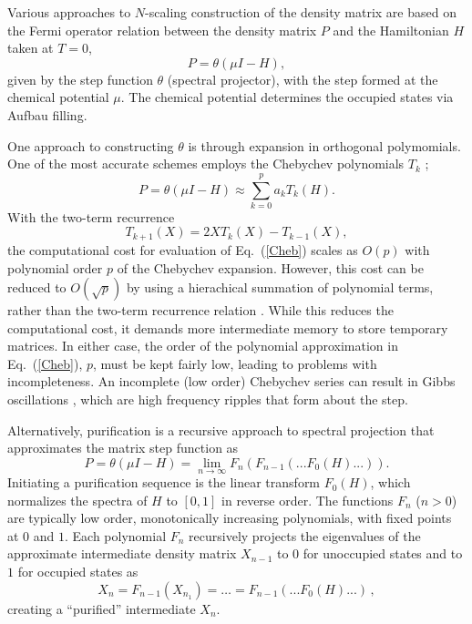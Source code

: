 \documentclass[twocolumn,showpacs,preprintnumbers,amsmath,amssymb]{revtex4}
\begin{document}
Various approaches to $N$-scaling construction of the density matrix are based on 
the Fermi operator relation between the density matrix $P$ and the Hamiltonian $H$
taken at $T=0$,
\begin{equation}\label{DM}
P = \theta(\mu I -  H),
\end{equation}
given by the step function $\theta$ (spectral projector), with the step formed at the chemical potential $\mu$.
The chemical potential determines the occupied states via Aufbau filling.   


One approach to constructing $\theta$ is through expansion in orthogonal polymomials.
One of the most accurate schemes employs the Chebychev polynomials $T_k$
\cite{SGoedecker94,RSilver94,LWang94,RBaer97,AVoter96,WLiang03};
\begin{equation}\label{Cheb}
P = \theta(\mu I -H) \approx \sum_{k=0}^p a_kT_k(H).
\end{equation}
With the two-term recurrence 
\begin{equation}
T_{k+1}(X) = 2XT_k(X)-T_{k-1}(X),
\end{equation}
the computational cost for evaluation of Eq.~(\ref{Cheb}) scales as $O(p)$ with
polynomial order $p$ of the Chebychev expansion. However, this cost can be reduced to 
$O({\sqrt p})$ by using a hierachical summation of polynomial terms, rather than the 
two-term recurrence relation \cite{MPaterson73,WLiang03}. While this reduces the 
computational cost, it demands more intermediate memory to store temporary matrices.  
In either case, the order of the polynomial approximation in Eq.~(\ref{Cheb}), $p$, must 
be kept fairly low, leading to problems with incompleteness.  An incomplete (low order) 
Chebychev series can result in Gibbs oscillations \cite{AVoter96}, which are high frequency 
ripples that form about the step.

 

Alternatively, purification is a recursive approach to spectral projection
\cite{APalser98,ANiklasson02A,ANiklasson04,ANiklasson03,NiklassonIPUR,RMcWeeny60,WClinton69,AHolas01,DMazziotti03}
that approximates the matrix step function as
\begin{equation}\label{Rec}
 P = \theta(\mu I -H) = \lim_{n \rightarrow \infty} F_n(F_{n-1}(...F_0(H)...)).
\end{equation}
Initiating a purification sequence is the linear transform $F_0(H)$, which  normalizes
the spectra of $H$ to $[0,1]$ in reverse order. The functions $F_n$ ($n>0$) are typically low order,
monotonically increasing polynomials, with fixed points at $0$ and $1$. Each
polynomial $F_n$ recursively projects the eigenvalues of the approximate intermediate 
density matrix  $X_{n-1}$ to $0$ for unoccupied states and to $1$ for occupied states as 
\begin{equation}
X_n = F_{n-1}(X_{n_1})= \ldots = F_{n-1}(...F_0(H)...) \, ,
\end{equation}
creating a ``purified'' intermediate $X_n$.  
\end{document}
